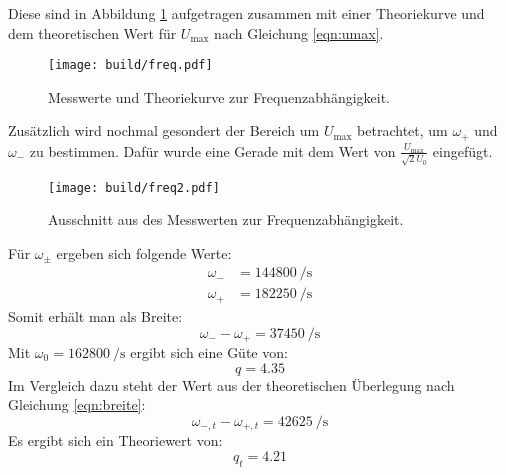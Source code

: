 \noindent
Diese sind in Abbildung \ref{fig:freq} aufgetragen zusammen mit einer Theoriekurve und dem theoretischen
Wert für $U_\text{max}$ nach Gleichung \eqref{eqn:umax}.
\begin{figure}
    \centering
    \caption{Messwerte und Theoriekurve zur Frequenzabhängigkeit.}
    \label{fig:freq}
    \texttt{[image: build/freq.pdf]}
\end{figure}
\noindent
Zusätzlich wird nochmal gesondert der Bereich um $U_\text{max}$ betrachtet, um $\omega_+$ und $\omega_-$
zu bestimmen. Dafür wurde eine Gerade mit dem Wert von $\frac{U_\text{max}}{\sqrt{2}U_0}$ eingefügt.
\begin{figure}[H]
    \centering
    \caption{Ausschnitt aus des Messwerten zur Frequenzabhängigkeit.}
    \label{fig:freq2}
    \texttt{[image: build/freq2.pdf]}
\end{figure}
\noindent
Für $\omega_\pm$ ergeben sich folgende Werte:
\begin{align}
    \omega_- &= \SI{144800}{\per\second}    \\
    \omega_+ &= \SI{182250}{\per\second}
\end{align}
Somit erhält man als Breite:
\begin{equation}
    \omega_--\omega_+ = \SI{37450}{\per\second}
\end{equation}
Mit $\omega_0 = \SI{162800}{\per\second}$ ergibt sich eine Güte von:
\begin{equation}
    q = 4.35
\end{equation}
Im Vergleich dazu steht der Wert aus der theoretischen Überlegung nach Gleichung \eqref{eqn:breite}:
\begin{equation}
    \omega_{-,t}-\omega_{+,t} = \SI{42625}{\per\second}
\end{equation}
Es ergibt sich ein Theoriewert von:
\begin{equation}
    q_t = 4.21
\end{equation}
%
